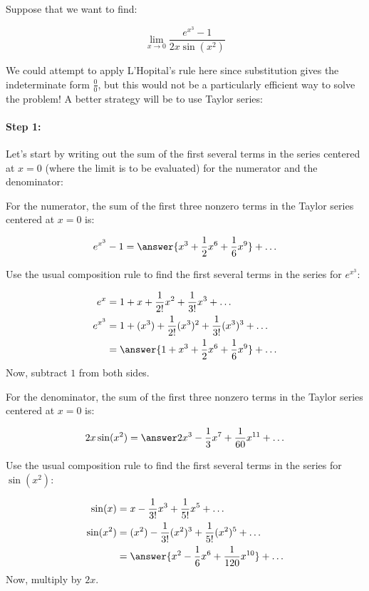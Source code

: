 \documentclass{ximera}
\author{Jim Talamo}
\begin{document}
\begin{exercise}
Suppose that we want to find:

\[
\lim_{x \to 0} \frac{e^{x^3}-1}{2x \sin(x^2)}
\]


We could attempt to apply L'Hopital's rule here since substitution gives the indeterminate form $\frac{0}{0}$, but this would not be a particularly efficient way to solve the problem!  A better strategy will be to use Taylor series:


\paragraph{Step 1:} Let's start by writing out the sum of the first several terms in the series centered at $x=0$ (where the limit is to be evaluated) for the numerator and the denominator:

\begin{exercise}
For the numerator, the sum of the first three nonzero terms in the Taylor series centered at $x=0$ is:

\[
e^{x^3}-1 = \answer{x^3+\frac{1}{2}x^6+\frac{1}{6}x^9} +\ldots
\]

\begin{hint}
Use the usual composition rule to find the first several terms in the series for $e^{x^3}$:

\begin{align*}
e^x &= 1+x+\frac{1}{2!}x^2+\frac{1}{3!}x^3+\ldots \\
e^{x^3} &= 1+(x^3)+\frac{1}{2!}(x^3)^2+\frac{1}{3!}(x^3)^3+\ldots \\
&= \answer{1+x^3+\frac{1}{2}x^6+\frac{1}{6}x^9}+\ldots \\
\end{align*}
Now, subtract $1$ from both sides.
\end{hint}
\end{exercise}


\begin{exercise}
For the denominator, the sum of the first three nonzero terms in the Taylor series centered at $x=0$ is:

\[
2x \sin(x^2) = \answer2{x^3-\frac{1}{3}x^7+\frac{1}{60}x^{11}} +\ldots
\]

\begin{hint}
Use the usual composition rule to find the first several terms in the series for $\sin(x^2)$:

\begin{align*}
\sin(x) &= x-\frac{1}{3!}x^3+\frac{1}{5!}x^5+\ldots \\
\sin(x^2) &= (x^2)-\frac{1}{3!}(x^2)^3+\frac{1}{5!}(x^2)^5+\ldots \\
&= \answer{x^2-\frac{1}{6}x^6+\frac{1}{120}x^{10}}+\ldots \\
\end{align*}
Now, multiply by $2x$.
\end{hint}
\end{exercise}



\end{exercise}
\end{document}
